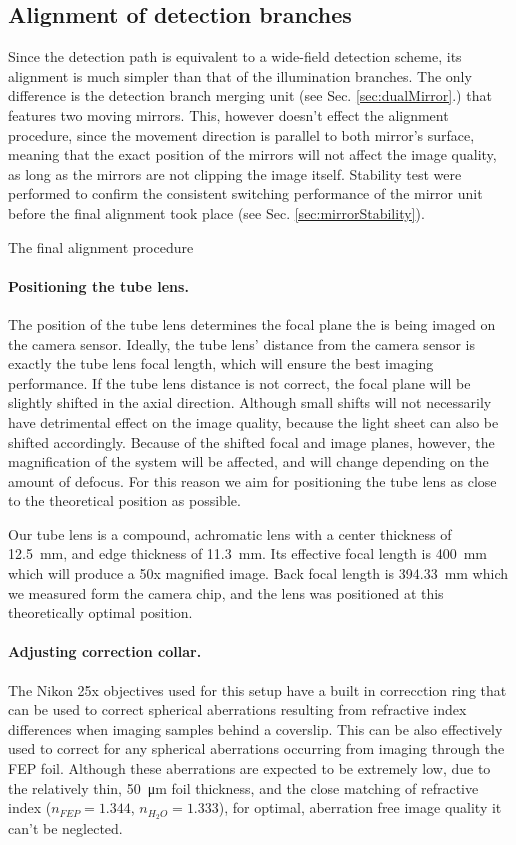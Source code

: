 \subsection{Alignment of detection branches}
Since the detection path is equivalent to a wide-field detection scheme, its alignment is much simpler than that of the illumination branches. The only difference is the detection branch merging unit (see Sec. \ref{sec:dualMirror}.) that features two moving mirrors. This, however doesn't effect the alignment procedure, since the movement direction is parallel to both mirror's surface, meaning that the exact position of the mirrors will not affect the image quality, as long as the mirrors are not clipping the image itself. Stability test were performed to confirm the consistent switching performance of the mirror unit before the final alignment took place (see Sec. \ref{sec:mirrorStability}).

The final alignment procedure 

\paragraph{Positioning the tube lens.}
The position of the tube lens determines the focal plane the is being imaged on the camera sensor. Ideally, the tube lens' distance from the camera sensor is exactly the tube lens focal length, which will ensure the best imaging performance. If the tube lens distance is not correct, the focal plane will be slightly shifted in the axial direction. Although small shifts will not necessarily have detrimental effect on the image quality, because the light sheet can also be shifted accordingly. Because of the shifted focal and image planes, however, the magnification of the system will be affected, and will change depending on the amount of defocus. For this reason we aim for positioning the tube lens as close to the theoretical position as possible.

Our tube lens is a compound, achromatic lens with a center thickness of \SI{12.5}{mm}, and edge thickness of \SI{11.3}{mm}. Its effective focal length is \SI{400}{mm} which will produce a 50x magnified image. Back focal length is \SI{394.33}{mm} which we measured form the camera chip, and the lens was positioned at this theoretically optimal position.

\paragraph{Adjusting correction collar.}
The Nikon 25x objectives used for this setup have a built in correcction ring that can be used to correct spherical aberrations resulting from refractive index differences when imaging samples behind a coverslip. This can be also effectively used to correct for any spherical aberrations occurring from imaging through the FEP foil. Although these aberrations are expected to be extremely low, due to the relatively thin, \SI{50}{\micro m} foil thickness, and the close matching of refractive index ($n_{FEP} = 1.344$, $n_{H_2O}=1.333$), for optimal, aberration free image quality it can't be neglected.

